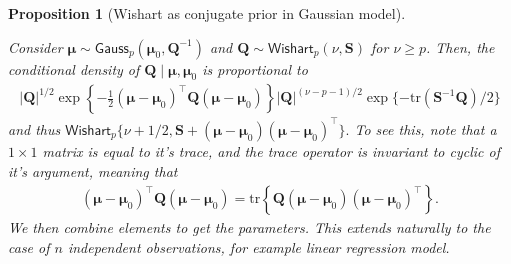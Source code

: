\documentclass[
  11pt,
  letterpaper,
]{scrbook}
\theoremstyle{definition}
\theoremstyle{definition}
\theoremstyle{definition}
\theoremstyle{plain}
\newtheorem{proposition}{Proposition}[chapter]
\theoremstyle{plain}
\theoremstyle{plain}
\theoremstyle{remark}
\begin{document}
\begin{proposition}[Wishart as conjugate prior in Gaussian
model]\protect\hypertarget{prp-conjugate-prior}{}\label{prp-conjugate-prior}

Consider
\(\boldsymbol{\mu} \sim \mathsf{Gauss}_p(\boldsymbol{\mu}_0, \boldsymbol{Q}^{-1})\)
and \(\boldsymbol{Q} \sim \mathsf{Wishart}_p(\nu, \mathbf{S})\) for
\(\nu \geq p\). Then, the conditional density of
\(\boldsymbol{Q} \mid \boldsymbol{\mu}, \boldsymbol{\mu}_0\) is
proportional to \begin{align*}
 |\boldsymbol{Q}|^{1/2} \exp \left\{ -\frac{1}{2} (\boldsymbol{\mu}-\boldsymbol{\mu}_0)^\top\boldsymbol{Q}(\boldsymbol{\mu}-\boldsymbol{\mu}_0)\right\} |\boldsymbol{Q}|^{(\nu-p-1)/2}\exp\{-\mathrm{tr}(\mathbf{S}^{-1}\boldsymbol{Q})/2\}
\end{align*} and thus
\(\mathsf{Wishart}_p\{\nu + 1/2, \boldsymbol{S} + (\boldsymbol{\mu}-\boldsymbol{\mu}_0)(\boldsymbol{\mu}-\boldsymbol{\mu}_0)^\top\}.\)
To see this, note that a \(1 \times 1\) matrix is equal to it's trace,
and the trace operator is invariant to cyclic of it's argument, meaning
that \begin{align*}
 (\boldsymbol{\mu}-\boldsymbol{\mu}_0)^\top\boldsymbol{Q}(\boldsymbol{\mu}-\boldsymbol{\mu}_0) = \mathrm{tr}\left\{ \boldsymbol{Q}(\boldsymbol{\mu}-\boldsymbol{\mu}_0)(\boldsymbol{\mu}-\boldsymbol{\mu}_0)^\top\right\}.
\end{align*} We then combine elements to get the parameters. This
extends naturally to the case of \(n\) independent observations, for
example linear regression model.

\end{proposition}
\end{document}
